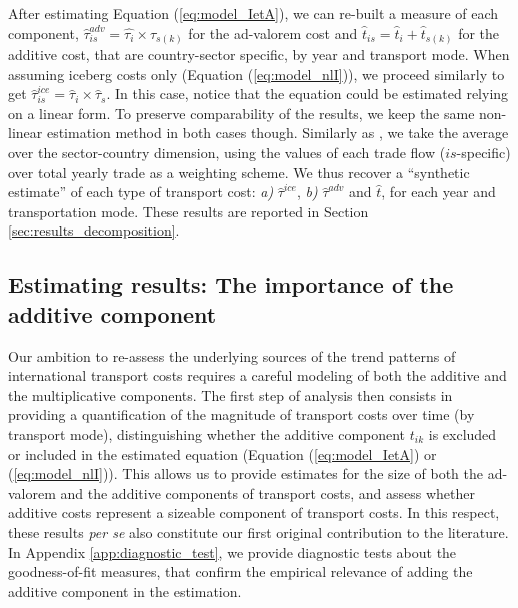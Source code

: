 \documentclass[a4paper,11pt]{article}
\begin{document}


After estimating Equation (\ref{eq:model_IetA}), we can re-built a measure of each component, $\widehat{\tau}^{adv}_{is} = \widehat{\tau_{i}} \times \widehat{\tau}_{s(k)}$ for the ad-valorem cost and $\widehat{t}_{is} = \widehat{t}_{i} + \widehat{t}_{s(k)}$ for the additive cost, that are country-sector specific, by year and transport mode. When assuming iceberg costs only (Equation (\ref{eq:model_nlI})), we proceed similarly to get $\widehat{\tau}^{ice}_{is} = \widehat{\tau}_{i} \times \widehat{\tau}_{s}$. In this case, notice that the equation could be estimated relying on a linear form. To preserve comparability of the results, we keep the same non-linear estimation method in both cases though. Similarly as \citet{Irrazabal_2015}, we take the average over the sector-country dimension, using the values of each trade flow ($is$-specific) over total yearly trade as a weighting scheme. We thus recover a ``synthetic estimate'' of each type of transport cost: \textit{a)} $\widehat{\tau}^{ice}$, \textit{b)} $\widehat{\tau}^{adv}$ and $\widehat{t}$, for each year and transportation mode. These results are reported in Section \ref{sec:results_decomposition}.


\subsection{Estimating results: The importance of the additive component \label{sec:results_decomposition}}

Our ambition to re-assess the underlying sources of the trend patterns of international transport costs requires a careful modeling of both the additive and the multiplicative components. The first step of analysis then consists in providing a quantification of the magnitude of transport costs over time (by transport mode), distinguishing whether the additive component $t_{ik}$ is excluded or included in the estimated equation (Equation (\ref{eq:model_IetA}) or (\ref{eq:model_nlI})). This allows us to provide estimates for the size of both the ad-valorem and the additive components of transport costs, and assess whether additive costs represent a sizeable component of transport costs. In this respect, these results \textit{per se} also constitute our first original contribution to the literature. In Appendix \ref{app:diagnostic_test}, we provide diagnostic tests about the goodness-of-fit measures, that confirm the empirical relevance of adding the additive component in the estimation.\smallskip
\end{document}
